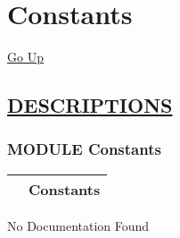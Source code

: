 \chapter*{\color{headfile}
Constants
}
\hypertarget{ecldoc:toc:Constants}{}
\hyperlink{ecldoc:toc:root}{Go Up}


\section*{\underline{\textsf{DESCRIPTIONS}}}
\subsection*{\textsf{\colorbox{headtoc}{\color{white} MODULE}
Constants}}

\hypertarget{ecldoc:Constants}{}

{\renewcommand{\arraystretch}{1.5}
\begin{tabularx}{\textwidth}{|>{\raggedright\arraybackslash}l|X|}
\hline
\hspace{0pt}\mytexttt{\color{red} } & \textbf{Constants} \\
\hline
\end{tabularx}
}

\par





No Documentation Found







